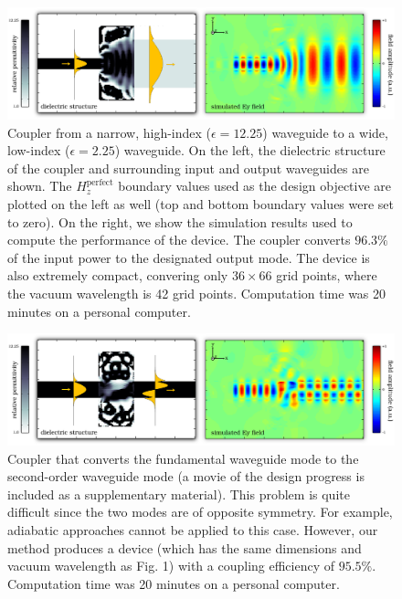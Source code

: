 \documentclass[letterpaper,10pt]{article}
\begin{document}
\begin{figure}[htbp]
    \centering
    \includegraphics[width=\textwidth]{fiber} 
    \caption{Coupler from a narrow, high-index ($\epsilon=12.25$) waveguide to
        a wide, low-index ($\epsilon=2.25$) waveguide. 
        On the left, the dielectric structure of the coupler 
        and surrounding input and output waveguides are shown.
        The $H_z^\text{perfect}$ boundary values used as 
        the design objective are plotted on the left as well
        (top and bottom boundary values were set to zero).
        On the right, we show the simulation results used
        to compute the performance of the device.
        The coupler converts $96.3\%$ of the input power to the
        designated output mode.
        The device is also extremely compact, 
        convering only $36 \times 66$ grid points,
        where the vacuum wavelength is 42 grid points.
        Computation time was 20 minutes on a personal computer.}
    \label{fig:fiber}
\end{figure}
\begin{figure}[htbp]
    \centering
    \includegraphics[width=\textwidth]{mode-conv} 
    \caption{Coupler that converts the fundamental waveguide mode to the
        second-order waveguide mode
        (a movie of the design progress is included as a
        supplementary material).
        This problem is quite difficult since the two modes are of 
        opposite symmetry.
        For example, adiabatic approaches cannot be applied to this case.
        However, our method produces a device 
        (which has the same dimensions and vacuum wavelength as Fig. 1) 
        with a coupling efficiency of $95.5\%$. 
        Computation time was 20 minutes on a personal computer.
        }
    \label{fig:mode}
    \end{figure}
\end{document}
